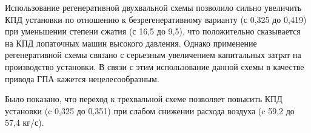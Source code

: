 Использование регенеративной двухвальной схемы позволило сильно увеличить КПД установки по отношению к безрегенеративному варианту (с 0,325 до 0,419) при уменьшении степени сжатия (с 16,5 до 9,5), что положительно сказывается на КПД лопаточных машин высокого давления. Однако применение регенеративной схемы связано с серьезным увеличением капитальных затрат на производство установки. В связи с этим использование данной схемы в качестве привода ГПА кажется нецелесообразным.
 
 Было показано, что переход к трехвальной схеме позволяет повысить КПД установки (c 0,325 до 0,351) при слабом снижении расхода воздуха (c 59,2 до 57,4 кг/с).
